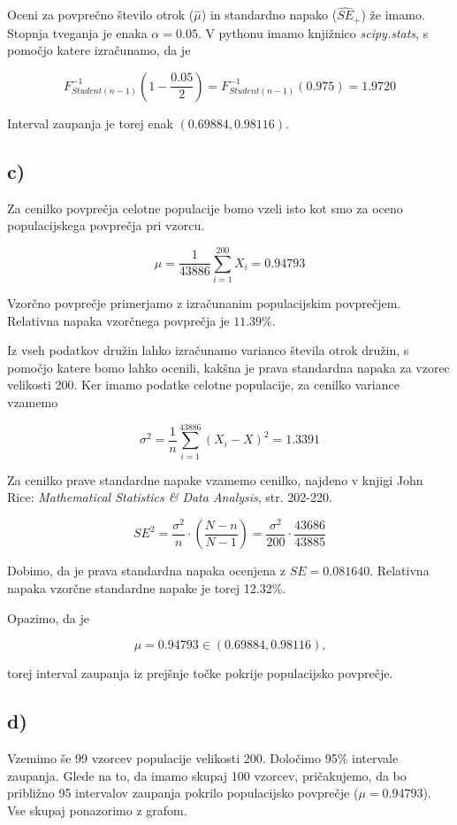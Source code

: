 \documentclass[12pt, a4paper]{article}
\begin{document}
Oceni za povprečno število otrok ($\hat{\mu}$) in standardno napako ($\widehat{SE}_+$) 
že imamo. Stopnja tveganja je enaka $\alpha = 0.05$. V pythonu imamo knjižnico
\emph{scipy.stats}, s pomočjo katere izračunamo, da je 

$$ F^{-1}_{Student(n-1)}(1 - \frac{0.05}{2}) = F^{-1}_{Student(n-1)}(0.975) = 1.9720
$$

Interval zaupanja je torej enak $(0.69884, 0.98116)$.

\subsection*{c)}

Za cenilko povprečja celotne populacije bomo vzeli isto kot smo za oceno populacijskega
povprečja pri vzorcu. 

$$ \mu = \frac{1}{43886}\sum^{200}_{i=1} X_i = 0.94793
$$

Vzorčno povprečje primerjamo z izračunanim populacijskim povprečjem. Relativna
 napaka vzorčnega povprečja je $11.39\%$. 

Iz vseh podatkov družin lahko izračunamo varianco števila otrok družin, s pomočjo
katere bomo lahko ocenili, kakšna je prava standardna napaka za vzorec velikosti 200.
Ker imamo podatke celotne populacije, za cenilko variance vzamemo

$$ \sigma^2 = \frac{1}{n} \sum_{i=1}^{43886} (X_i - X)^2 = 1.3391
$$

Za cenilko prave standardne napake vzamemo cenilko, najdeno v knjigi John Rice:
\emph{Mathematical Statistics \& Data Analysis}, str. 202-220. 

$$ SE^2 = \frac{\sigma^2}{n} \cdot (\frac{N-n}{N-1}) = \frac{\sigma^2}{200} \cdot \frac{43686}{43885}
$$

Dobimo, da je prava standardna napaka ocenjena z $SE = 0.081640$. Relativna napaka
vzorčne standardne napake je torej 12.32\%.

Opazimo, da je

$$ \mu = 0.94793 \in (0.69884, 0.98116) \text{,}
$$

torej interval zaupanja iz prejšnje točke pokrije populacijsko povprečje.

\subsection*{d)}

Vzemimo še 99 vzorcev populacije velikosti 200. Določimo 95\% intervale zaupanja. 
Glede na to, da imamo skupaj 100
vzorcev, pričakujemo, da bo približno 95 intervalov zaupanja pokrilo populacijsko
povprečje ($\mu = 0.94793$). Vse skupaj ponazorimo z grafom.
\end{document}
